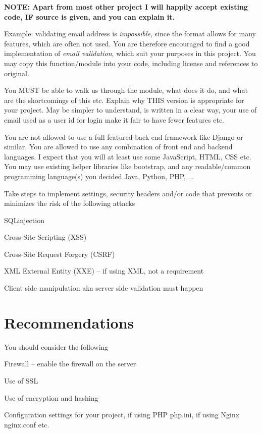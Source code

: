 \documentclass[a4paper,11pt,notitlepage]{report}
\begin{document}
{\bf NOTE: Apart from most other project I will happily accept existing code, IF source is given, and you can explain it.}

Example: validating email address is \emph{impossible}, since the format allows for many features, which are often not used. You are therefore encouraged to find a good implementation of \emph{email validation}, which suit your purposes in this project. You may copy this function/module into your code, including license and references to original.

You MUST be able to walk us through the module, what does it do, and what are the shortcomings of this etc. Explain why THIS version is appropriate for your project. May be simpler to understand, is written in a clear way, your use of email used as a user id for login make it fair to have fewer features etc.

You are not allowed to use a full featured back end framework like Django or similar. You are allowed to use any combination of front end and backend languages. I expect that you will at least use some JavaScript, HTML, CSS etc. You may use existing helper libraries like bootstrap, and any readable/common programming language(s) you decided Java, Python, PHP, ...

Take steps to implement settings, security headers and/or code that prevents or minimizes the risk of
the following attacks

\begin{list2}
\item SQLinjection
\item Cross-Site Scripting (XSS)
\item Cross-Site Request Forgery (CSRF)
\item XML External Entity (XXE) -- if using XML, not a requirement
\item Client side manipulation aka server side validation must happen
\end{list2}


\section*{Recommendations}

You should consider the following
\begin{list2}
\item Firewall -- enable the firewall on the server
\item Use of SSL
\item Use of encryption and hashing
\item Configuration settings for your project, if using PHP php.ini, if using Nginx nginx.conf etc.
\end{list2}
\end{document}
